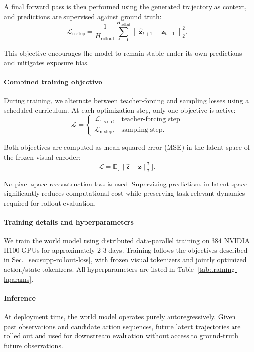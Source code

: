 A final forward pass is then performed using the generated trajectory as context, and predictions are supervised against ground truth:
\[
\mathcal{L}_{\text{n-step}}
=
\frac{1}{H_{\text{rollout}}}
\sum_{t=1}^{H_{\text{rollout}}}
\left\|
\hat{\mathbf{z}}_{t+1}
-
\mathbf{z}_{t+1}
\right\|_2^2 .
\]

This objective encourages the model to remain stable under its own predictions and mitigates exposure bias.

\paragraph{Combined training objective}
During training, we alternate between teacher-forcing and sampling losses using a scheduled curriculum. At each optimization step, only one objective is active:
\[
\mathcal{L} =
\begin{cases}
\mathcal{L}_{\text{1-step}}, & \text{teacher-forcing step} \\
\mathcal{L}_{\text{n-step}}, & \text{sampling step}.
\end{cases}
\]

Both objectives are computed as mean squared error (MSE) in the latent space of the frozen visual encoder:
\[
\mathcal{L}
= \mathbb{E}\big[
\|\hat{\mathbf{z}} - \mathbf{z}\|_2^2
\big].
\]

No pixel-space reconstruction loss is used. Supervising predictions in latent space significantly reduces computational cost while preserving task-relevant dynamics required for rollout evaluation.



\paragraph{Training details and hyperparameters}
We train the world model using distributed data-parallel training on 384 NVIDIA H100 GPUs for approximately 2-3 days. Training follows the objectives described in Sec.~\ref{sec:supp-rollout-loss}, with frozen visual tokenizers and jointly optimized action/state tokenizers. All hyperparameters are listed in Table~\ref{tab:training-hparams}. 


\paragraph{Inference}
At deployment time, the world model operates purely autoregressively. Given past observations and candidate action sequences, future latent trajectories are rolled out and used for downstream evaluation without access to ground-truth future observations.




